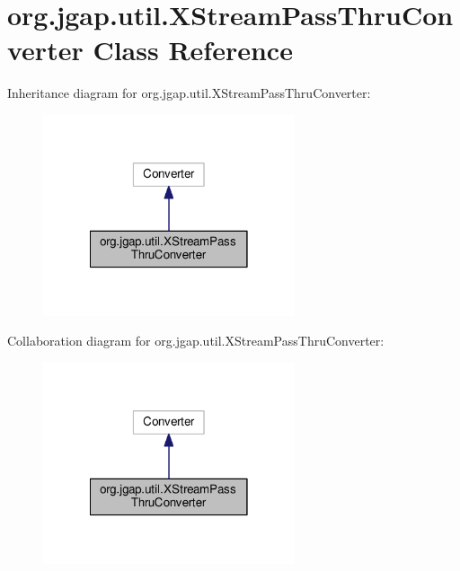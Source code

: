 \hypertarget{classorg_1_1jgap_1_1util_1_1_x_stream_pass_thru_converter}{\section{org.\-jgap.\-util.\-X\-Stream\-Pass\-Thru\-Converter Class Reference}
\label{classorg_1_1jgap_1_1util_1_1_x_stream_pass_thru_converter}
}


Inheritance diagram for org.\-jgap.\-util.\-X\-Stream\-Pass\-Thru\-Converter\-:
\nopagebreak
\begin{figure}[H]
\begin{center}
\leavevmode
\includegraphics[width=210pt]{classorg_1_1jgap_1_1util_1_1_x_stream_pass_thru_converter__inherit__graph}
\end{center}
\end{figure}


Collaboration diagram for org.\-jgap.\-util.\-X\-Stream\-Pass\-Thru\-Converter\-:
\nopagebreak
\begin{figure}[H]
\begin{center}
\leavevmode
\includegraphics[width=210pt]{classorg_1_1jgap_1_1util_1_1_x_stream_pass_thru_converter__coll__graph}
\end{center}
\end{figure}
